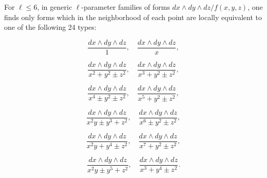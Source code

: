 For $\ell \leq 6$, in generic $\ell$-parameter families of forms $dx \wedge dy \wedge dz / f(x, y, z)$, one finds only forms which in the neighborhood of each point are locally equivalent to one of the following 24 types:

$$\frac{dx \wedge dy \wedge dz}{1}, \quad \frac{dx \wedge dy \wedge dz}{x},$$

$$\frac{dx \wedge dy \wedge dz}{x^2 + y^2 \pm z^2}, \quad \frac{dx \wedge dy \wedge dz}{x^3 + y^2 \pm z^2},$$

$$\frac{dx \wedge dy \wedge dz}{x^4 \pm y^2 \pm z^2}, \quad \frac{dx \wedge dy \wedge dz}{x^5 + y^2 \pm z^2},$$

$$\frac{dx \wedge dy \wedge dz}{x^2 y \pm y^3 + z^2}, \quad \frac{dx \wedge dy \wedge dz}{x^6 \pm y^2 \pm z^2},$$

$$\frac{dx \wedge dy \wedge dz}{x^2 y + y^4 \pm z^2}, \quad \frac{dx \wedge dy \wedge dz}{x^7 + y^2 \pm z^2},$$

$$\frac{dx \wedge dy \wedge dz}{x^2 y \pm y^5 + z^2}, \quad \frac{dx \wedge dy \wedge dz}{x^3 + y^4 \pm z^2}.$$
